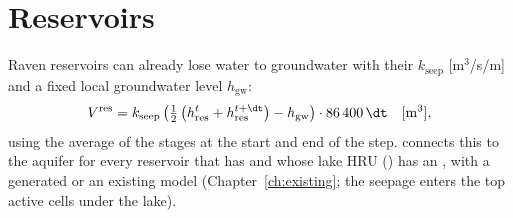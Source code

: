\section{Reservoirs}\label{ch:reservoirs}
Raven reservoirs can already lose water to groundwater with their  $k_{\mathrm{seep}}$ [m$^3$/s/m] and a fixed
local groundwater level $h_{\mathrm{gw}}$:
\begin{equation}
V^{\mathrm{res}}=k_{\mathrm{seep}}\left(\tfrac12\left(h^{t}_{\mathrm{res}}+h^{t+\dt}_{\mathrm{res}}\right)-h_{\mathrm{gw}}\right)\cdot86\,400\,\dt
\quad[\mathrm{m}^3],
\end{equation}
using the average of the stages at the start and end of the step.  connects this to the aquifer
for every reservoir that has  and whose lake HRU () has an , with a
generated or an existing model (Chapter~\ref{ch:existing}; the seepage enters the top active cells under the lake).

